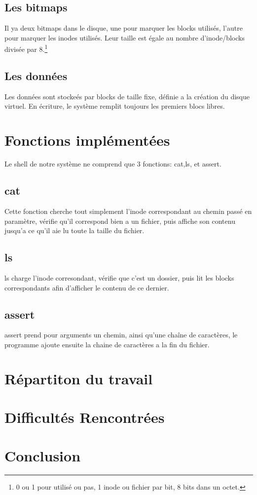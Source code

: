 \documentclass{report}
\begin{document}
\subsection*{Les bitmaps}
Il ya deux bitmaps dans le disque, une pour marquer les blocks utilisés, l'autre pour marquer les inodes utilisés. Leur taille est égale au nombre d'inode/blocks divisée par 8.\footnote{0 ou 1 pour utilisé ou pas, 1 inode ou fichier par bit, 8 bits dans un octet.}
\subsection*{Les données}
Les données sont stockeés par blocks de taille fixe, définie a la création du disque virtuel. En écriture, le système remplit toujours les premiers blocs libres.

\section*{Fonctions implémentées}
Le shell de notre système ne comprend que 3 fonctions: cat,ls, et assert.
\subsection*{cat}
Cette fonction cherche tout simplement l'inode correspondant au chemin passé en paramètre, vérifie qu'il correspond bien a un fichier, puis affiche son contenu jusqu'a ce qu'il aie lu toute la taille du fichier.
\subsection*{ls}
ls charge l'inode corresondant, vérifie que c'est un dossier, puis lit les blocks correspondants afin d'afficher le contenu de ce dernier.
\subsection*{assert}
assert prend pour arguments un chemin, ainsi qu'une chaîne de caractères, le programme ajoute ensuite la chaine de caractères a la fin du fichier.

\section*{Répartiton du travail}


\section*{Difficultés Rencontrées}



\section*{Conclusion}
\end{document}

